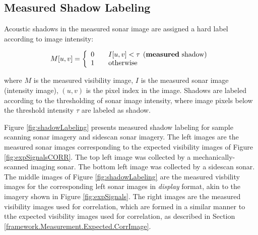 \subsection{Measured Shadow Labeling}
\label{framework.Measurement.Measured}

Acoustic shadows in the measured sonar image are assigned a hard label according to image intensity:

\begin{equation}
M[u,v] = \left\{ 
  \begin{array}{l l}
    0 & \quad I[u,v] < \tau \hspace{1ex} \text{(\textbf{measured} shadow)}\\
    1 & \quad \text{otherwise}
  \end{array} \right.
  \label{eq:shadowLabels}
\end{equation}

\noindent where $M$ is the measured visibility image, $I$ is the measured sonar image (intensity image), $(u,v)$ is the pixel index in the image.
Shadows are labeled according to the thresholding of sonar image intensity, where image pixels below the threshold intensity $\tau$ are labeled as shadow.  

Figure \ref{fig:shadowLabeling} presents measured shadow labeling for sample scanning sonar imagery and sidescan sonar imagery.
The left images are the measured sonar images corresponding to the expected visibility images of Figure \ref{fig:expSignalsCORR}.
The top left image was collected by a mechanically-scanned imaging sonar.
The bottom left image was collected by a sidescan sonar. 
The middle images of Figure \ref{fig:shadowLabeling} are the measured visbility images for the corresponding left sonar images in \emph{display} format, akin to the imagery shown in Figure \ref{fig:expSignals}.
The right images are the measured visibility images used for correlation, which are formed in a similar manner to tthe expected visibility images used for correlation, as described in Section \ref{framework.Measurement.Expected.CorrImage}.

